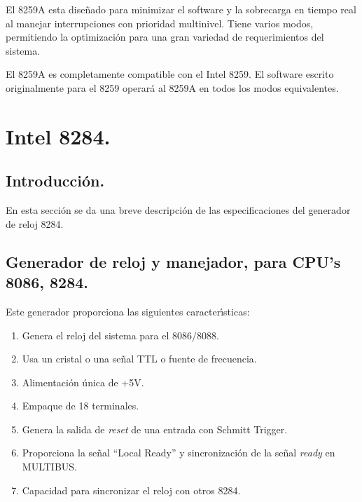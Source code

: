 El 8259A esta dise\~nado para minimizar el software y la sobrecarga en tiempo real al manejar %
interrupciones con prioridad multinivel. Tiene varios modos, permitiendo la optimizaci\'on para %
una gran variedad de requerimientos del sistema.

El 8259A es completamente compatible con el Intel 8259. El software escrito originalmente para el %
8259 operar\'a al 8259A en todos los modos equivalentes.


\section{Intel 8284.}
\label{Section:8284}


\subsection{Introducci\'on.}
\label{Subsection:intro8284}

En esta secci\'on se da una breve descripci\'on de las especificaciones del generador de reloj %
8284.


\subsection{Generador de reloj y manejador, para CPU's 8086, 8284.}
\label{Subsection:clock8284}

Este generador proporciona las siguientes caracter\'{\i}sticas:

\begin{enumerate}
\item Genera el reloj del sistema para el 8086/8088.
\item Usa un cristal o una se\~nal TTL o fuente de frecuencia.
\item Alimentaci\'on \'unica de +5V.
\item Empaque de 18 terminales.
\item Genera la salida de {\it reset\/} de una entrada con Schmitt Trigger.
\item Proporciona la se\~nal ``Local Ready'' y sincronizaci\'on de la se\~nal {\it ready\/} %
en MULTIBUS.
\item Capacidad para sincronizar el reloj con otros 8284.
\end{enumerate}

